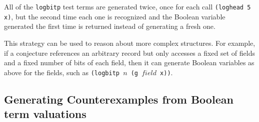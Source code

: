 \documentclass[submission,copyright,creativecommons]{eptcs}
\newcommand*{\var}[1]{\mathit{#1}}
\begin{document}
All of the \texttt{logbitp} test terms are generated twice, once for each call
\texttt{(loghead 5 x)}, but the second time each one is recognized and
the Boolean variable generated the first time is returned instead of
generating a fresh one.

This strategy can be used to reason about more complex structures.
For example, if a conjecture references an arbitrary record but only
accesses a fixed set of fields and a fixed number of bits of each
field, then it can generate Boolean variables as above for the fields,
such as \texttt{(logbitp $n$ (g $\var{field}$ x))}.

\subsection{Generating Counterexamples from Boolean term valuations}
\label{sec:counterexes}
\end{document}
